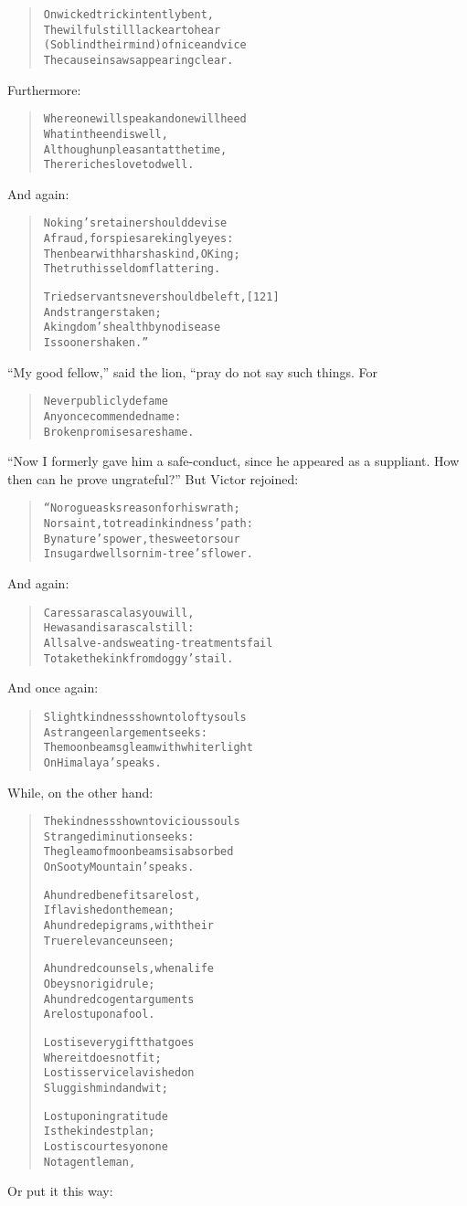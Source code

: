 \documentclass[article, twoside, 14pt]{memoir}
\renewenvironment{verbatim}{%
\begin{quote}%
\vskip -10pt%
\begin{alltt}\normalfont\large}{\end{alltt}%
\end{quote}%
\vskip -10pt
} %
\begin{document}
\begin{verbatim}
On wicked trick intently bent,
    The wilful still lack ear to hear
(So blind their mind) of nice and vice
    The cause in saws appearing clear.
\end{verbatim}
Furthermore:

\begin{verbatim}
Where one will speak and one will heed
    What in the end is well,
Although unpleasant at the time,
    There riches love to dwell.
\end{verbatim}
And again:

\begin{verbatim}
No king's retainer should devise
A fraud, for spies are kingly eyes:
Then bear with harsh as kind, O King;
The truth is seldom flattering.

Tried servants never should be left,                    [121]
    And strangers taken;
A kingdom's health by no disease
    Is sooner shaken.”
\end{verbatim}
``My good fellow,'' said the lion, “pray do not say such things.
For

\begin{verbatim}
Never publicly defame
Any once commended name:
Broken promises are shame.
\end{verbatim}
``Now I formerly gave him a safe-conduct, since he appeared as a suppliant. How then can he prove ungrateful?''
But Victor rejoined:

\begin{verbatim}
“No rogue asks reason for his wrath;
Nor saint, to tread in kindness' path:
By nature's power, the sweet or sour
In sugar dwells or nim-tree's flower.
\end{verbatim}
And again:

\begin{verbatim}
Caress a rascal as you will,
He was and is a rascal still:
All salve- and sweating-treatments fail
To take the kink from doggy's tail.
\end{verbatim}
And once again:

\begin{verbatim}
Slight kindness shown to lofty souls
A strange enlargement seeks:
The moonbeams gleam with whiter light
On Himalaya's peaks.
\end{verbatim}
While, on the other hand:

\begin{verbatim}
The kindness shown to vicious souls
    Strange diminution seeks:
The gleam of moonbeams is absorbed
    On Sooty Mountain's peaks.

A hundred benefits are lost,
    If lavished on the mean;
A hundred epigrams, with their
    True relevance unseen;

A hundred counsels, when a life
    Obeys no rigid rule;
A hundred cogent arguments
    Are lost upon a fool.

Lost is every gift that goes
    Where it does not fit;
Lost is service lavished on
    Sluggish mind and wit;

Lost upon ingratitude
    Is the kindest plan;
Lost is courtesy on one
    Not a gentleman,
\end{verbatim}
Or put it this way:
\end{document}
